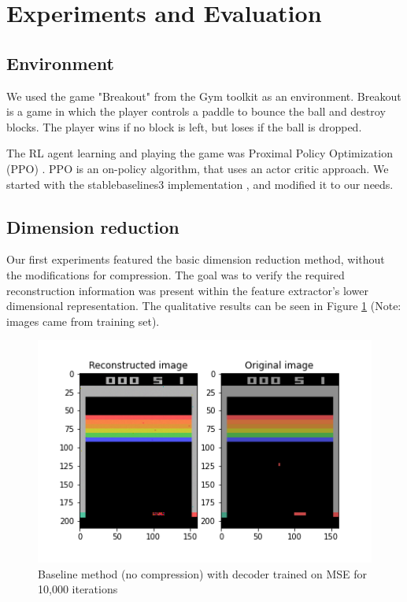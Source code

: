 \section{Experiments and Evaluation}
\subsection{Environment}
We used the game "Breakout" from the Gym toolkit \cite{brockman2016openai} as an
environment. Breakout is a game in which the player controls a paddle to bounce the ball and destroy blocks. The player wins if no block is left, but loses if the ball is dropped.

The RL agent learning and playing the game was Proximal
Policy Optimization (PPO) \cite{raffin2019stable}. PPO is an on-policy
algorithm, that uses an actor critic approach. We started with the stablebaselines3 implementation \cite{raffin2019stable}, and
modified it to our needs.

\subsection{Dimension reduction}\label{sub:Dimension_reduction}
Our first experiments featured the basic dimension reduction method,
without the modifications for compression. The goal was to verify the
required reconstruction information was present within the feature extractor's lower dimensional
representation. The qualitative results can be
seen in Figure \ref{fig:baseline_MSE} (Note: images came
from training set). \\

\begin{figure}[H]
    \centering
    \includegraphics[width=\linewidth]{images/orig_reconstructed0.0.png}
    \caption{Baseline method (no compression) with decoder trained on MSE for 10,000 iterations}
    \label{fig:baseline_MSE}
\end{figure}


